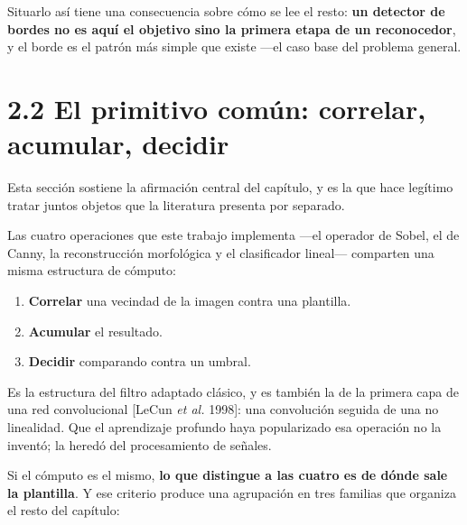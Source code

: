 Situarlo así tiene una consecuencia sobre cómo se lee el resto:
\textbf{un detector de bordes no es aquí el objetivo sino la primera
etapa de un reconocedor}, y el borde es el patrón más simple que existe
---el caso base del problema general.

\section{2.2 El primitivo común: correlar, acumular,
decidir}\label{el-primitivo-comuxfan-correlar-acumular-decidir}

Esta sección sostiene la afirmación central del capítulo, y es la que
hace legítimo tratar juntos objetos que la literatura presenta por
separado.

Las cuatro operaciones que este trabajo implementa ---el operador de
Sobel, el de Canny, la reconstrucción morfológica y el clasificador
lineal--- comparten una misma estructura de cómputo:

\begin{enumerate}
\def\labelenumi{\arabic{enumi}.}
\tightlist
\item
  \textbf{Correlar} una vecindad de la imagen contra una plantilla.
\item
  \textbf{Acumular} el resultado.
\item
  \textbf{Decidir} comparando contra un umbral.
\end{enumerate}

Es la estructura del filtro adaptado clásico, y es también la de la
primera capa de una red convolucional {[}LeCun \emph{et al.} 1998{]}:
una convolución seguida de una no linealidad. Que el aprendizaje
profundo haya popularizado esa operación no la inventó; la heredó del
procesamiento de señales.

Si el cómputo es el mismo, \textbf{lo que distingue a las cuatro es de
dónde sale la plantilla}. Y ese criterio produce una agrupación en tres
familias que organiza el resto del capítulo:

